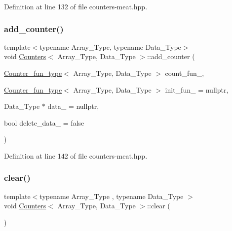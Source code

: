 Definition at line 132 of file counters-\/meat.\+hpp.

\mbox{\label{class_counters_a4ee47504f9c76892c6028619e6b138ee}} 
\subsubsection{\texorpdfstring{add\+\_\+counter()}{add\_counter()}\hspace{0.1cm}{\footnotesize\ttfamily [3/3]}}
{\footnotesize\ttfamily template$<$typename Array\+\_\+\+Type, typename Data\+\_\+\+Type$>$ \\
void \hyperlink{class_counters}{Counters}$<$ Array\+\_\+\+Type, Data\+\_\+\+Type $>$\+::add\+\_\+counter (\begin{DoxyParamCaption}\item[{\hyperlink{typedefs_8hpp_ac0160f52f564dea3ac033b374cffbfe7}{Counter\+\_\+fun\+\_\+type}$<$ Array\+\_\+\+Type, Data\+\_\+\+Type $>$}]{count\+\_\+fun\+\_\+,  }\item[{\hyperlink{typedefs_8hpp_ac0160f52f564dea3ac033b374cffbfe7}{Counter\+\_\+fun\+\_\+type}$<$ Array\+\_\+\+Type, Data\+\_\+\+Type $>$}]{init\+\_\+fun\+\_\+ = {\ttfamily nullptr},  }\item[{Data\+\_\+\+Type $\ast$}]{data\+\_\+ = {\ttfamily nullptr},  }\item[{bool}]{delete\+\_\+data\+\_\+ = {\ttfamily false} }\end{DoxyParamCaption})\hspace{0.3cm}{\ttfamily [inline]}}



Definition at line 142 of file counters-\/meat.\+hpp.

\mbox{\label{class_counters_ae4635c154970a13ce88d2e982fe7dab3}} 
\subsubsection{\texorpdfstring{clear()}{clear()}}
{\footnotesize\ttfamily template$<$typename Array\+\_\+\+Type , typename Data\+\_\+\+Type $>$ \\
void \hyperlink{class_counters}{Counters}$<$ Array\+\_\+\+Type, Data\+\_\+\+Type $>$\+::clear (\begin{DoxyParamCaption}{ }\end{DoxyParamCaption})\hspace{0.3cm}{\ttfamily [inline]}}



